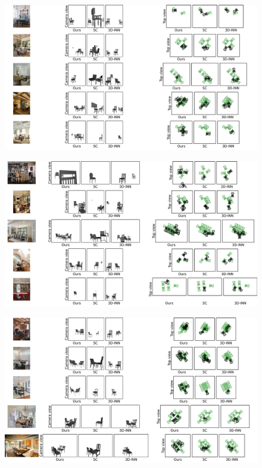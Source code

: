 \begin{figure}
    \includegraphics[width=\textwidth]{figures/qualitative_results/full/qual_results_9.pdf}
\end{figure}
\begin{figure}
    \includegraphics[width=\textwidth]{figures/qualitative_results/full/qual_results_10.pdf}
\end{figure}
\begin{figure}
    \includegraphics[width=\textwidth]{figures/qualitative_results/full/qual_results_11.pdf}
\end{figure}
